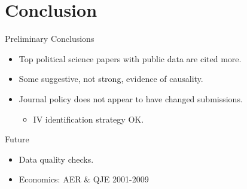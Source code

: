\documentclass{beamer}
\begin{document}
\begin{frame}{}
\scalebox{0.60}{}
\end{frame}

\section{Conclusion}

\begin{frame}{Preliminary Conclusions}

  \begin{itemize}
  \item
    Top political science papers with public data are cited more.
  \item
    Some suggestive, not strong, evidence of causality.
  \item
    Journal policy does not appear to have changed submissions.
    \begin{itemize}
    \item IV identification strategy OK.
    \end{itemize}
  \end{itemize}
\end{frame}

\begin{frame}{Future}
	\begin{itemize}
	\item Data quality checks.
	\item Economics: AER \& QJE 2001-2009
	\end{itemize}
\end{frame}
\end{document}
